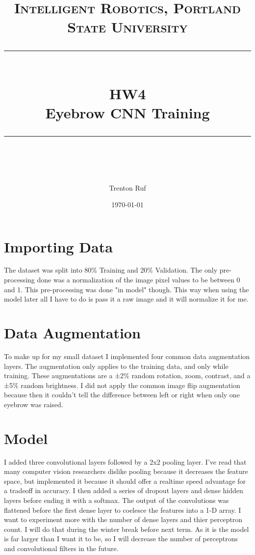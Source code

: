 \documentclass[11pt]{scrartcl} %
\title{	
	\normalfont\normalsize
	\textsc{Intelligent Robotics, Portland State University}\\ %
	\vspace{25pt} %
	\rule{\linewidth}{0.5pt}\\ %
	\vspace{20pt} %
	{\huge HW4}\\ %
	\vspace{4pt} %
	{\large Eyebrow CNN Training}\\ %
	\vspace{12pt} %
	\rule{\linewidth}{2pt}\\ %
	\vspace{12pt} %
}
\author{\LARGE Trenton Ruf} %
\date{\normalsize \today} %
\begin{document}
\maketitle %




\renewcommand\thesubsection{\Roman{subsection}}

\section{Importing Data}
The dataset was split into 80\% Training and 20\% Validation. 
The only pre-processing done was a normalization of the image pixel values to be between 0 and 1.
This pre-processing was done "in model" though. 
This way when using the model later all I have to do is pass it a raw image and it will normalize it for me.

\section{Data Augmentation}
To make up for my small dataset I implemented four common data augmentation layers. The augmentation only applies to the training data, and only while training. These augmentations are a ±2\% random rotation, zoom, contrast, and a ±5\% random brightness. I did not apply the common image flip augmentation because then it couldn't tell the difference between left or right when only one eyebrow was raised.


\section{Model}
I added three convolutional layers followed by a 2x2 pooling layer. 
I've read that many computer vision researchers dislike pooling because it decreases the feature space, but implemented it because it should offer a realtime speed advantage for a tradeoff in accuracy.
I then added a series of dropout layers and dense hidden layers before ending it with a softmax.
The output of the convolutions was flattened before the first dense layer to coelesce the features into a 1-D array.
I want to experiment more with the number of dense layers and thier perceptron count. I will do that during the winter break before next term.
As it is the model is far larger than I want it to be, so I will decrease the number of perceptrons and convolutional filters in the future.
\end{document}
